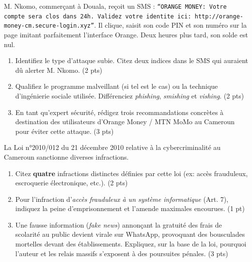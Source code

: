 \documentclass[11pt]{article}
\begin{document}
\begin{exercice}
M. Nkomo, commerçant à Douala, reçoit un SMS : \texttt{``ORANGE MONEY: Votre compte sera clos dans 24h. Validez votre identite ici: http://orange-money-cm.secure-login.xyz''}. Il clique, saisit son code PIN et son numéro sur la page imitant parfaitement l'interface Orange. Deux heures plus tard, son solde est nul.
\begin{enumerate}
    \item Identifiez le type d'attaque subie. Citez deux indices dans le SMS qui auraient dû alerter M. Nkomo. \hfill (2 pts)
    \item Qualifiez le programme malveillant (si tel est le cas) ou la technique d'ingénierie sociale utilisée. Différenciez \textit{phishing}, \textit{smishing} et \textit{vishing}. \hfill (2 pts)
    \item En tant qu'expert sécurité, rédigez trois recommandations concrètes à destination des utilisateurs d'Orange Money / MTN MoMo au Cameroun pour éviter cette attaque. \hfill (3 pts)
\end{enumerate}
\end{exercice}

\begin{exercice}
La Loi n°2010/012 du 21 décembre 2010 relative à la cybercriminalité au Cameroun sanctionne diverses infractions.
\begin{enumerate}
    \item Citez \textbf{quatre} infractions distinctes définies par cette loi (ex: accès frauduleux, escroquerie électronique, etc.). \hfill (2 pts)
    \item Pour l'infraction d'\textit{accès frauduleux à un système informatique} (Art. 7), indiquez la peine d'emprisonnement et l'amende maximales encourues. \hfill (1 pt)
    \item Une fausse information (\textit{fake news}) annonçant la gratuité des frais de scolarité au public devient virale sur WhatsApp, provoquant des bousculades mortelles devant des établissements. Expliquez, sur la base de la loi, pourquoi l'auteur et les relais massifs s'exposent à des poursuites pénales. \hfill (3 pts)
\end{enumerate}
\end{exercice}
\end{document}
